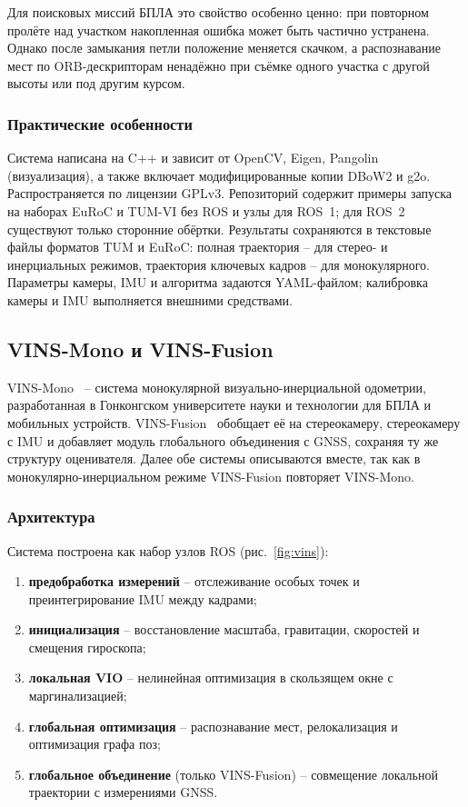     Для поисковых миссий БПЛА это свойство особенно ценно: при повторном пролёте над участком накопленная ошибка может быть частично устранена.
    Однако после замыкания петли положение меняется скачком, а распознавание мест по ORB-дескрипторам ненадёжно при съёмке одного участка с другой высоты или под другим курсом.

    \subsubsection{Практические особенности}
    Система написана на C++ и зависит от OpenCV, Eigen, Pangolin (визуализация), а также включает модифицированные копии DBoW2 и g2o.
    Распространяется по лицензии GPLv3.
    Репозиторий содержит примеры запуска на наборах EuRoC и TUM-VI без ROS и узлы для ROS~1; для ROS~2 существуют только сторонние обёртки.
    Результаты сохраняются в текстовые файлы форматов TUM и EuRoC: полная траектория -- для стерео- и инерциальных режимов, траектория ключевых кадров -- для монокулярного.
    Параметры камеры, IMU и алгоритма задаются YAML-файлом; калибровка камеры и IMU выполняется внешними средствами.

    \subsection{VINS-Mono и VINS-Fusion}

    VINS-Mono~\cite{vins_mono} -- система монокулярной визуально-инерциальной одометрии, разработанная в Гонконгском университете науки и технологии для БПЛА и мобильных устройств.
    VINS-Fusion~\cite{vins_fusion} обобщает её на стереокамеру, стереокамеру с IMU и добавляет модуль глобального объединения с GNSS, сохраняя ту же структуру оценивателя.
    Далее обе системы описываются вместе, так как в монокулярно-инерциальном режиме VINS-Fusion повторяет VINS-Mono.

    \subsubsection{Архитектура}
    Система построена как набор узлов ROS (рис.~\ref{fig:vins}):
    \begin{enumerate}
        \item \textbf{предобработка измерений} -- отслеживание особых точек и преинтегрирование IMU между кадрами;
        \item \textbf{инициализация} -- восстановление масштаба, гравитации, скоростей и смещения гироскопа;
        \item \textbf{локальная VIO} -- нелинейная оптимизация в скользящем окне с маргинализацией;
        \item \textbf{глобальная оптимизация} -- распознавание мест, релокализация и оптимизация графа поз;
        \item \textbf{глобальное объединение} (только VINS-Fusion) -- совмещение локальной траектории с измерениями GNSS.
    \end{enumerate}

